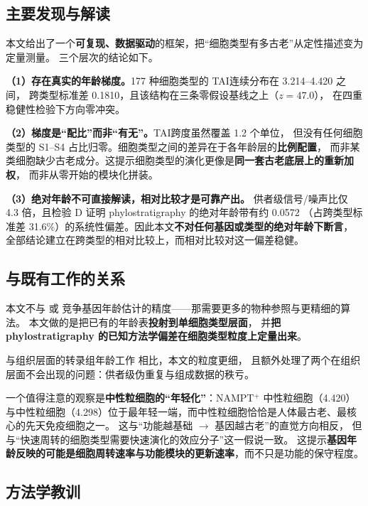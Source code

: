 \documentclass[numsec,webpdf,modern,large]{oup-authoring-template}
\newcommand{\tai}{\textrm{TAI}}
\begin{document}
\subsection{主要发现与解读}

本文给出了一个\textbf{可复现、数据驱动}的框架，把“细胞类型有多古老”从定性描述变为定量测量。
三个层次的结论如下。

\textbf{（1）存在真实的年龄梯度。}177 种细胞类型的 \tai 连续分布在 3.214--4.420 之间，
跨类型标准差 0.1810，且该结构在三条零假设基线之上（$z = 47.0$），
在四重稳健性检验下方向零冲突。

\textbf{（2）梯度是“配比”而非“有无”。}\tai 跨度虽然覆盖 1.2 个单位，
但没有任何细胞类型的 S1--S4 占比归零。细胞类型之间的差异在于各年龄层的\textbf{比例配置}，
而非某类细胞缺少古老成分。这提示细胞类型的演化更像是\textbf{同一套古老底层上的重新加权}，
而非从零开始的模块化拼装。

\textbf{（3）绝对年龄不可直接解读，相对比较才是可靠产出。}
供者级信号/噪声比仅 4.3 倍，且检验 D 证明 phylostratigraphy 的绝对年龄带有约 0.0572
（占跨类型标准差 31.6\%）的系统性偏差。因此本文\textbf{不对任何基因或类型的绝对年龄下断言}，
全部结论建立在跨类型的相对比较上，而相对比较对这一偏差稳健。

\subsection{与既有工作的关系}

本文不与 \citet{trigos2017} 或 \citet{domazetloso2017}
竞争基因年龄估计的精度——那需要更多的物种参照与更精细的算法。
本文做的是把已有的年龄表\textbf{投射到单细胞类型层面}，
并\textbf{把 phylostratigraphy 的已知方法学偏差在细胞类型粒度上定量出来}。

与组织层面的转录组年龄工作\citep{lu2017} 相比，本文的粒度更细，
且额外处理了两个在组织层面不会出现的问题：供者级伪重复与组成数据的秩亏。

一个值得注意的观察是\textbf{中性粒细胞的“年轻化”}：NAMPT$^{+}$ 中性粒细胞（4.420）
与中性粒细胞（4.298）位于最年轻一端，而中性粒细胞恰恰是人体最古老、最核心的先天免疫细胞之一。
这与“功能越基础 $\to$ 基因越古老”的直觉方向相反，
但与“快速周转的细胞类型需要快速演化的效应分子”这一假说一致。
这提示\textbf{基因年龄反映的可能是细胞周转速率与功能模块的更新速率}，而不只是功能的保守程度。

\subsection{方法学教训}
\end{document}
